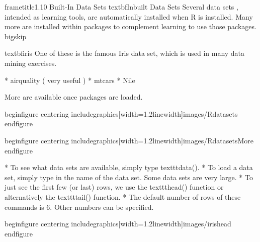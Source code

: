  	
 	
 	
 	
 		frametitle{1.10 Built-In Data Sets}
 		textbf{Inbuilt Data Sets}
 		Several data sets , intended as learning tools, are automatically installed when R is installed.
 		Many more are installed within packages to complement learning to use those packages. 
 		bigskip
 		
 		textbf{iris} One
 		of these is the famous Iris data set, which is used in many data mining exercises.
 		
 		
 			         * airquality  ( very useful )
 			         * mtcars
 			         * Nile
 		
 		More are available once packages are loaded.
 		
 	
 	
 		begin{figure}
 			centering
 			includegraphics[width=1.2linewidth]{images/Rdatasets}        
 		end{figure}
 	   
 	
 		begin{figure}
 			centering
 			includegraphics[width=1.2linewidth]{images/RdatasetsMore}   
 		end{figure}
 	   
 	
 		
 		
 			         * To see what data sets are available, simply type texttt{data()}.
 			          * To load a data set, simply type in the
 			name of the data set. Some data sets are very large.
 			          * To just see the first few (or last) rows, we
 			use the texttt{head()} function or alternatively the texttt{tail()} function. 
 			         * The default number of rows of
 			these commands is 6. Other numbers can be specified.
 		
 		
 	
 	
 		begin{figure}
 			centering 
 			includegraphics[width=1.2linewidth]{images/irishead}      
 		end{figure}
 	   
 	
